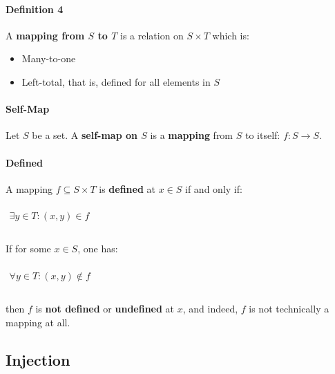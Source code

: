\paragraph{Definition 4}

A \textbf{mapping from $S$ to $T$} is a relation on $S \times T$ which is:

\begin{itemize}
\item Many-to-one
\item Left-total, that is, defined for all elements in $S$
\end{itemize}

\paragraph{Self-Map}
\label{sec:self-map}

Let $S$ be a set. A \textbf{self-map on $S$} is a \textbf{mapping}
from $S$ to itself: $f: S \to S$.

\paragraph{Defined}
\label{sec:defined}

A mapping $f \subseteq S \times T$ is \textbf{defined} at $x \in S$ if
and only if:

\begin{math}
  \begin{array}{c}
    \\
    \exists y \in T: (x, y) \in f\\
    \\
  \end{array}
\end{math}

If for some $x \in S$, one has:

\begin{math}
  \begin{array}{c}
    \\
    \forall y \in T: (x, y) \notin f\\
    \\
  \end{array}
\end{math}

then $f$ is \textbf{not defined} or \textbf{undefined} at $x$, and
indeed, $f$ is not technically a mapping at all.


\subsection{Injection}
\label{sec:injection}


